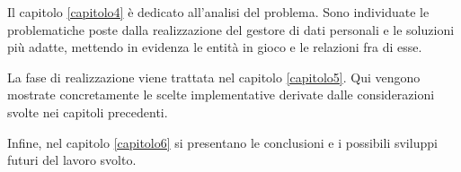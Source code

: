 Il capitolo \ref{capitolo4} \`e dedicato all'analisi del problema. Sono individuate le problematiche poste dalla realizzazione del gestore di dati personali e le soluzioni pi\`u adatte, mettendo in evidenza le entit\`a in gioco e le relazioni fra di esse.

La fase di realizzazione viene trattata nel capitolo \ref{capitolo5}. Qui vengono mostrate concretamente le scelte implementative derivate dalle considerazioni svolte nei capitoli precedenti.

Infine, nel capitolo \ref{capitolo6} si presentano le conclusioni e i possibili sviluppi futuri del lavoro svolto.

